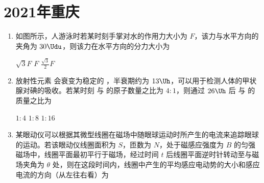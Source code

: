 \documentclass[\gkver]{gaokaozhenti}
\begin{document}
\chapter{2021年重庆}

\begin{enumerate}
\item
如图所示，人游泳时若某时刻手掌对水的作用力大小为 $F$，该力与水平方向的夹角为 $30\Udu$，则该力在水平方向的分力大小为 


{$\sqrt{3}F$}
{$F$}
{$\frac{\sqrt{3}}{2}F$}


\item
放射性元素  会衰变为稳定的 ，半衰期约为 $13\Uh$，可以用于检测人体的甲状腺对碘的吸收。若某时刻  与  的原子数量之比为 $4:1$，则通过 $26\Uh$ 后  与  的质量之比为 

{$1:4$}
{$1:8$}
{$1:16$}


\item
某眼动仪可以根据其微型线圈在磁场中随眼球运动时所产生的电流来追踪眼球的运动。若该眼动仪线圈面积为 $S$，匝数为 $N$，处于磁感应强度为 $B$ 的匀强磁场中，线圈平面最初平行于磁场，经过时间 $t$ 后线圈平面逆时针转动至与磁场夹角为 $\theta$ 处，则在这段时间内，线圈中产生的平均感应电动势的大小和感应电流的方向（从左往右看）为 


\end{enumerate}
\end{document}
